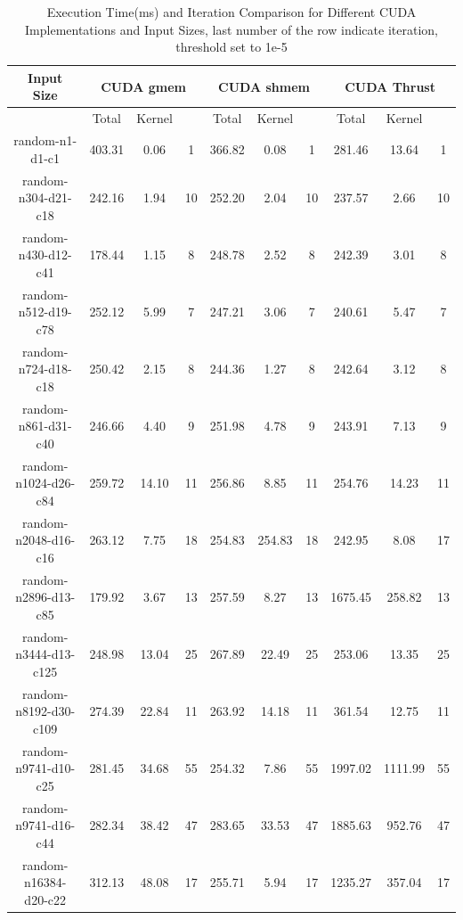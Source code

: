 \documentclass[letterpaper,12pt]{article}
\theoremstyle{remark}
\begin{document}
\begin{table}[ht]
\centering
\caption{Execution Time(ms) and Iteration Comparison for Different CUDA Implementations and Input Sizes, last number of the row indicate iteration, threshold set to 1e-5}
\begin{tabular}{|c|c|c|c|c|c|c|c|c|c|}
\hline
\textbf{Input Size} & \multicolumn{3}{c|}{\textbf{CUDA gmem}} & \multicolumn{3}{c|}{\textbf{CUDA shmem}} & \multicolumn{3}{c|}{\textbf{CUDA Thrust}} \\
\hline
& Total & Kernel  &  & Total & Kernel &   & Total & Kernel & \\
\hline
random-n1-d1-c1      &  403.31  & 0.06  &  1  &  366.82  &  0.08  &  1  &  281.46  & 13.64  &  1  \\
random-n304-d21-c18  &  242.16  & 1.94  & 10  &  252.20  &  2.04  & 10  &  237.57  &  2.66  & 10  \\
random-n430-d12-c41  &  178.44  & 1.15  &  8  &  248.78  &  2.52  &  8  &  242.39  &  3.01  &  8  \\
random-n512-d19-c78  &  252.12  & 5.99  &  7  &  247.21  &  3.06  &  7  &  240.61  &  5.47  &  7  \\
random-n724-d18-c18  &  250.42  & 2.15  &  8  &  244.36  &  1.27  &  8  &  242.64  &  3.12  &  8  \\
random-n861-d31-c40  &  246.66  & 4.40  &  9  &  251.98  &  4.78  &  9  &  243.91  &  7.13  &  9  \\
random-n1024-d26-c84 &  259.72  & 14.10 & 11  &  256.86  &  8.85  & 11  &  254.76  & 14.23  & 11  \\
random-n2048-d16-c16 &  263.12  & 7.75  & 18  &  254.83  & 254.83 & 18  &  242.95  &  8.08  & 17  \\
random-n2896-d13-c85 &  179.92  & 3.67  & 13  &  257.59  &  8.27  & 13  & 1675.45  & 258.82  & 13  \\
random-n3444-d13-c125&  248.98  & 13.04 & 25  &  267.89  & 22.49  & 25  &  253.06  & 13.35  & 25  \\
random-n8192-d30-c109&  274.39  & 22.84 & 11  &  263.92  & 14.18  & 11  &  361.54  & 12.75  & 11  \\
random-n9741-d10-c25 &  281.45  & 34.68 & 55  &  254.32  &  7.86  & 55  & 1997.02  & 1111.99 & 55  \\
random-n9741-d16-c44 &  282.34  & 38.42 & 47  &  283.65  & 33.53  & 47  & 1885.63  & 952.76  & 47  \\
random-n16384-d20-c22&  312.13  & 48.08 & 17  &  255.71  &  5.94  & 17  & 1235.27  & 357.04  & 17  \\

\end{tabular}
\end{table}
\end{document}
